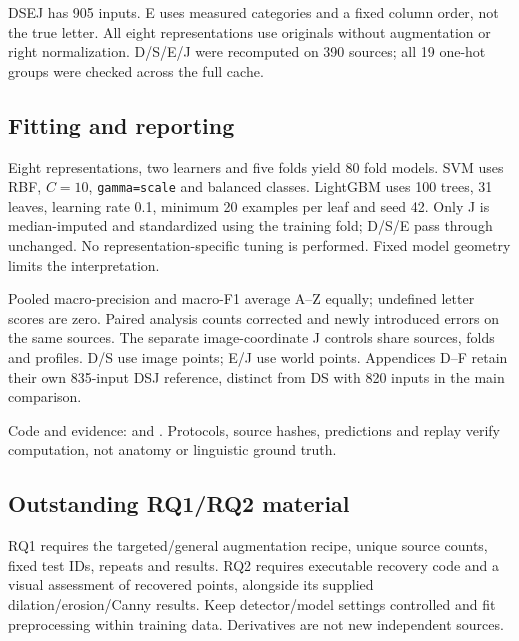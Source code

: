 DSEJ has 905 inputs. E uses measured categories and a fixed column order, not the true letter. All eight representations use originals without augmentation or right normalization. D/S/E/J were recomputed on 390 sources; all 19 one-hot groups were checked across the full cache.

\subsection{Fitting and reporting}
Eight representations, two learners and five folds yield 80 fold models. SVM uses RBF, $C=10$, \texttt{gamma=scale} and balanced classes. LightGBM uses 100 trees, 31 leaves, learning rate 0.1, minimum 20 examples per leaf and seed 42. Only J is median-imputed and standardized using the training fold; D/S/E pass through unchanged. No representation-specific tuning is performed. Fixed model geometry limits the interpretation.

Pooled macro-precision and macro-F1 average A--Z equally; undefined letter scores are zero. Paired analysis counts corrected and newly introduced errors on the same sources. The separate image-coordinate J controls share sources, folds and profiles. D/S use image points; E/J use world points. Appendices D--F retain their own 835-input DSJ reference, distinct from DS with 820 inputs in the main comparison.

Code and evidence:  and . Protocols, source hashes, predictions and replay verify computation, not anatomy or linguistic ground truth.

\subsection{Outstanding RQ1/RQ2 material}
RQ1 requires the targeted/general augmentation recipe, unique source counts, fixed test IDs, repeats and results. RQ2 requires executable recovery code and a visual assessment of recovered points, alongside its supplied dilation/erosion/Canny results. Keep detector/model settings controlled and fit preprocessing within training data. Derivatives are not new independent sources.
